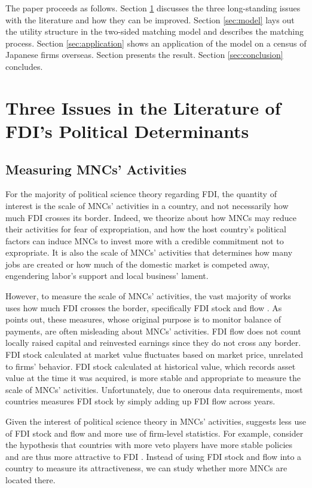 The paper proceeds as follows. Section \ref{sec:literature_issues} discusses the
three long-standing issues with the literature and how they can be improved.
Section \ref{sec:model} lays out the utility structure in the two-sided matching
model and describes the matching process. Section \ref{sec:application} shows an
application of the model on a census of Japanese firms overseas. Section
presents the result. Section \ref{sec:conclusion} concludes.

\section{Three Issues in the Literature of FDI's Political Determinants}
\label{sec:literature_issues}

\subsection{Measuring MNCs' Activities}

For the majority of political science theory regarding FDI, the quantity of interest is the scale of MNCs' activities in a country, and not necessarily how much FDI crosses its border. Indeed, we theorize about how MNCs may reduce their activities for fear of expropriation, and how the host country's political factors can induce MNCs to invest more with a credible commitment not to expropriate. It is also the scale of MNCs' activities that determines how many jobs are created or how much of the domestic market is competed away, engendering labor's support and local business' lament.

However, to measure the scale of MNCs' activities, the vast majority of works uses how much FDI crosses the border, specifically FDI stock and flow \citep{Jensen2003, Ahlquist2006, Beazer2011, Graham2010}. As \citet{Kerner2014} points out, these measures, whose original purpose is to monitor balance of payments, are often misleading about MNCs' activities. FDI flow does not count locally raised capital and reinvested earnings since they do not cross any border. FDI stock calculated at market value fluctuates based on market price, unrelated to firms' behavior. FDI stock calculated at historical value, which records asset value at the time it was acquired, is more stable and appropriate to measure the scale of MNCs' activities. Unfortunately, due to onerous data requirements, most countries measures FDI stock by simply adding up FDI flow across years.

Given the interest of political science theory in MNCs' activities, \citet{Kerner2014} suggests less use of FDI stock and flow and more use of firm-level statistics. For example, consider the hypothesis that countries with more veto players have more stable policies and are thus more attractive to FDI \citep{Li2009a}. Instead of using FDI stock and flow into a country to measure its attractiveness, we can study whether more MNCs are located there.

